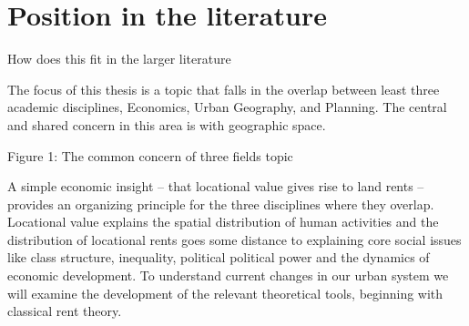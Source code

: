 \section{Position in the literature}

How does this fit in the larger literature

The focus of this thesis is a topic that falls in the overlap  between least three academic  disciplines, Economics, Urban Geography, and Planning. The central and shared concern in this area is with geographic space. 


Figure 1: The common concern of three fields
topic 

A simple economic insight -- that locational value gives rise to land rents -- provides an organizing principle for the three disciplines where they overlap. Locational value explains the spatial distribution of human activities and the distribution of locational rents goes some distance to explaining  core social issues like class structure, inequality, political political power and the dynamics of economic development.  To understand current changes in our urban system we will examine the development of the relevant theoretical tools, beginning with classical rent theory.



